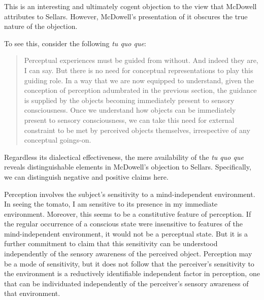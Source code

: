 \documentclass[12pt]{article}
\begin{document}
This is an interesting and ultimately cogent objection to the view that McDowell attributes to Sellars. However, McDowell's presentation of it obscures the true nature of the objection.


To see this, consider the following \emph{tu quo que}: 
\begin{quote}
    Perceptual experiences must be guided from without. And indeed they are, I can say. But there is no need for conceptual representations to play this guiding role. In a way that we are now equipped to understand, given the conception of perception adumbrated in the previous section, the guidance is supplied by the objects becoming immediately present to sensory consciousness. Once we understand how objects can be immediately present to sensory consciousness, we can take this need for external constraint to be met by perceived objects themselves, irrespective of any conceptual goings-on.
\end{quote}
Regardless its dialectical effectiveness, the mere availability of the \emph{tu quo que} reveals distinguishable elements in McDowell's objection to Sellars. Specifically, we can distinguish negative and positive claims here.

Perception involves the subject's sensitivity to a mind-independent environment. In seeing the tomato, I am sensitive to its presence in my immediate environment. Moreover, this seems to be a constitutive feature of perception. If the regular occurrence of a conscious state were insensitive to features of the mind-independent environment, it would not be a perceptual state. But it is a further commitment to claim that this sensitivity can be understood independently of the sensory awareness of the perceived object. Perception may be a mode of sensitivity, but it does not follow that the perceiver's sensitivity to the environment is a reductively identifiable independent factor in perception, one that can be individuated independently of the perceiver's sensory awareness of that environment.
\end{document}

